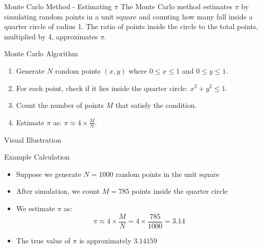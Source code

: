 \begin{frame}{Monte Carlo Method - Estimating $\pi$}
  The Monte Carlo method estimates $\pi$ by simulating random points in a unit square and counting how many fall inside a quarter circle of radius 1. The ratio of points inside the circle to the total points, multiplied by 4, approximates $\pi$.
\end{frame}



\begin{frame}{Monte Carlo Algorithm}
  \begin{enumerate}
    \item Generate $N$ random points $(x, y)$ where $0 \leq x \leq 1$ and $0 \leq y \leq 1$.
    \item For each point, check if it lies inside the quarter circle: $x^2 + y^2 \leq 1$.
    \item Count the number of points $M$ that satisfy the condition.
    \item Estimate $\pi$ as: $\pi \approx 4 \times \frac{M}{N}$.
  \end{enumerate}
\end{frame}

\begin{frame}{Visual Illustration}
  \begin{center}
  \end{center}
\end{frame}


\begin{frame}{Example Calculation}
  \begin{itemize}
    \item Suppose we generate $N = 1000$ random points in the unit square
    \item After simulation, we count $M = 785$ points inside the quarter circle
    \item We estimate $\pi$ as:
          \[ \pi \approx 4 \times \frac{M}{N} = 4 \times \frac{785}{1000} = 3.14 \]
    \item The true value of $\pi$ is approximately $3.14159$
  \end{itemize}
\end{frame}

